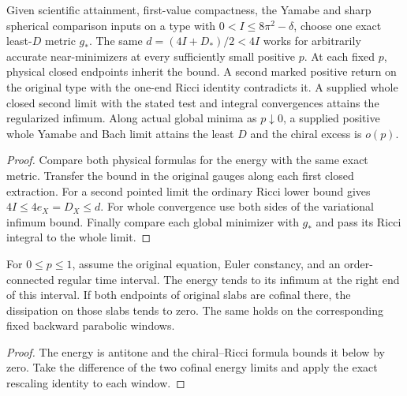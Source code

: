 \begin{proposition}
\label{prop:ed50-second}
\leanok
Given scientific attainment, first-value compactness, the Yamabe and
sharp spherical comparison inputs on a type with $0<I\le8\pi^2-\delta$,
choose one exact least-$D$ metric $g_*$. The same
$d=(4I+D_*)/2<4I$ works for arbitrarily accurate near-minimizers at
every sufficiently small positive $p$. At each fixed $p$, physical closed
endpoints inherit the bound. A second marked positive return on the
original type with the one-end Ricci identity contradicts it.
A supplied whole closed second limit with the stated test and integral
convergences attains the regularized infimum. Along actual global
minima as $p\downarrow0$, a supplied positive whole Yamabe and Bach
limit attains the least $D$ and the chiral excess is $o(p)$.
\end{proposition}
\begin{proof}
\leanok
Compare both physical formulas for the energy with the same exact metric.
Transfer the bound in the original gauges along each first closed extraction.
For a second pointed limit the ordinary Ricci lower bound gives
$4I\le4e_X=D_X\le d$. For whole convergence use both sides of the
variational infimum bound. Finally compare each global minimizer with $g_*$
and pass its Ricci integral to the whole limit.
\end{proof}

\begin{proposition}
\label{prop:ed50-terminal}
\leanok
For $0\le p\le1$, assume the original equation, Euler constancy, and an
order-connected regular time interval. The energy tends to its infimum
at the right end of this interval. If both endpoints of original slabs
are cofinal there, the dissipation on those slabs tends to zero. The same
holds on the corresponding fixed backward parabolic windows.
\end{proposition}
\begin{proof}
\leanok
The energy is antitone and the chiral--Ricci formula bounds it below by zero.
Take the difference of the two cofinal energy limits and apply the exact
rescaling identity to each window.
\end{proof}


